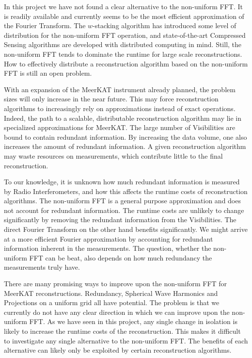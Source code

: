 In this project we have not found a clear alternative to the non-uniform FFT. It is readily available and currently seems to be the most efficient approximation of the Fourier Transform. The $w$-stacking algorithm\cite{offringa2014wsclean} has introduced some level of distribution for the non-uniform FFT operation, and state-of-the-art Compressed Sensing algorithms\cite{dabbech2018cygnus, pratley2018fast} are developed with distributed computing in mind. Still, the non-uniform FFT tends to dominate the runtime for large scale reconstructions. How to effectively distribute a reconstruction algorithm based on the non-uniform FFT is still an open problem.

With an expansion of the MeerKAT instrument already planned, the problem sizes will only increase in the near future. This may force reconstruction algorithms to increasingly rely on approximations instead of exact operations. Indeed, the path to a scalable, distributable reconstruction algorithm may lie in specialized approximations for MeerKAT. The large number of Visibilities are bound to contain redundant information. By increasing the data volume, one also increases the amount of redundant information. A given reconstruction algorithm may waste resources on measurements, which contribute little to the final reconstruction.

To our knowledge, it is unknown how much redundant information is measured by Radio Interferometers, and how this affects the runtime costs of reconstruction algorithms. The non-uniform FFT is a general purpose approximation and does not account for redundant information. The runtime costs are unlikely to change significantly by removing the redundant information from the Visibilities. The direct Fourier Transform on the other hand benefits significantly. We might arrive at a more efficient Fourier approximation by accounting for redundant information inherent in the measurements. The question, whether the non-uniform FFT can be beat, also depends on how much redundancy the measurements truly have.

There are many promising ways to improve upon the non-uniform FFT for MeerKAT reconstructions. Redundancy, Spherical Wave Harmonics and Projections on a uniform grid all have potential. The problem is that we currently do not have any clear direction in which we can improve upon the non-uniform FFT. As we have seen in this project, any single change in isolation is likely to increase the runtime costs of the reconstruction. This makes it difficult to investigate any single alternative to the non-uniform FFT. The benefits of each alternative can likely only be exploited by certain reconstruction algorithms.

